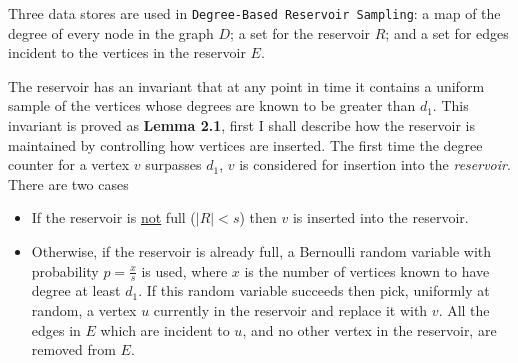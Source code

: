 \documentclass[11pt,twoside,a4paper]{report}
\begin{document}
\par Three data stores are used in \texttt{Degree-Based Reservoir Sampling}: a map of the degree of every node in the graph $D$; a set for the reservoir $R$; and a set for edges incident to the vertices in the reservoir $E$.

\par The reservoir has an invariant that at any point in time it contains a uniform sample of the vertices whose degrees are known to be greater than $d_1$. This invariant is proved as \textbf{Lemma 2.1}, first I shall describe how the reservoir is maintained by controlling how vertices are inserted. The first time the degree counter for a vertex $v$ surpasses $d_1$, $v$ is considered for insertion into the \textit{reservoir}. There are two cases
\begin{itemize}
	\item If the reservoir is \underline{not} full (\ie $|R|<s$) then $v$ is inserted into the reservoir.
	\item Otherwise, if the reservoir is already full, a Bernoulli random variable with probability $p=\frac{x}s$ is used, where $x$ is the number of vertices known to have degree at least $d_1$. If this random variable succeeds then pick, uniformly at random, a vertex $u$ currently in the reservoir and replace it with $v$. All the edges in $E$ which are incident to $u$, and no other vertex in the reservoir, are removed from $E$.
\end{itemize}
\end{document}
